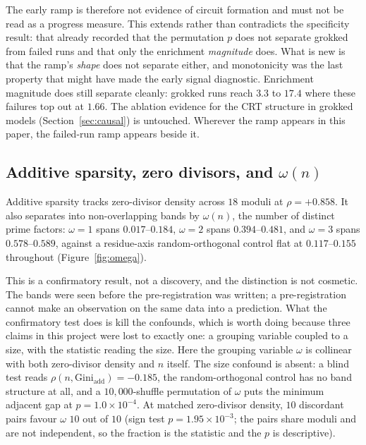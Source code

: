 The early ramp is therefore not evidence of circuit formation and must not be read as a
progress measure. This extends rather than contradicts the specificity result: that
already recorded that the permutation $p$ does not separate grokked from failed runs and that
only the enrichment \emph{magnitude} does. What is new is that the ramp's \emph{shape} does not
separate either, and monotonicity was the last property that might have made the early signal
diagnostic. Enrichment magnitude does still separate cleanly:
grokked runs reach $3.3$ to $17.4$ where these failures top out at $1.66$. The ablation
evidence for the CRT structure in grokked models (Section~\ref{sec:causal}) is untouched. Wherever the ramp appears in this
paper, the failed-run ramp appears beside it.

\subsection{Additive sparsity, zero divisors, and $\omega(n)$}
\label{sec:crt-omega}

Additive sparsity tracks zero-divisor density across $18$ moduli at $\rho = +0.858$. It also
separates into non-overlapping bands by $\omega(n)$, the number of distinct prime factors:
$\omega = 1$ spans $0.017$--$0.184$, $\omega = 2$ spans $0.394$--$0.481$, and $\omega = 3$
spans $0.578$--$0.589$, against a residue-axis random-orthogonal control flat at
$0.117$--$0.155$ throughout (Figure~\ref{fig:omega}).

This is a confirmatory result, not a discovery, and the distinction is not cosmetic.
The bands were seen before the pre-registration was written; a pre-registration cannot make an
observation on the same data into a prediction. What the confirmatory test does is kill the
confounds, which is worth doing because three claims in this project were lost to exactly one:
a grouping variable coupled to a size, with the statistic reading the size. Here the
grouping variable $\omega$ is collinear with both zero-divisor density and $n$ itself. The
size confound is absent: a blind test reads $\rho(n, \mathrm{Gini}_{\text{add}}) = -0.185$, the
random-orthogonal control has no band structure at all, and a $10{,}000$-shuffle permutation of
$\omega$ puts the minimum adjacent gap at $p = 1.0 \times 10^{-4}$. At matched zero-divisor
density, $10$ discordant pairs favour $\omega$ $10$ out of $10$ (sign test
$p = 1.95 \times 10^{-3}$; the pairs share moduli and are not independent, so the fraction is
the statistic and the $p$ is descriptive).

